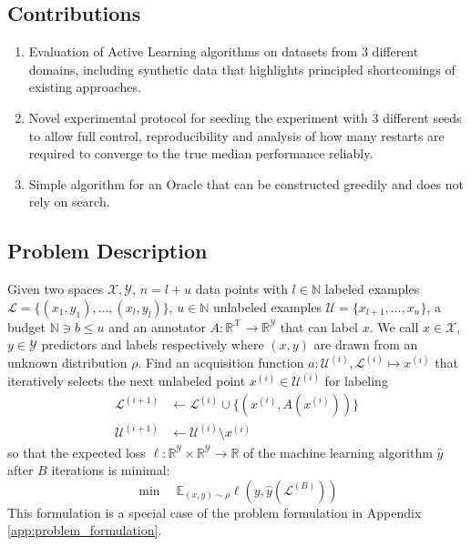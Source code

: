 \documentclass[]{article}
\newcommand{\U}{\mathcal{U}}
\newcommand{\LL}{\mathcal{L}}
\begin{document}
\subsection*{Contributions}
\begin{enumerate}
	\item Evaluation of Active Learning algorithms on datasets from 3 different domains, including synthetic data that highlights principled shortcomings of existing approaches.
	\item Novel experimental protocol for seeding the experiment with 3 different seeds to allow full control, reproducibility and analysis of how many restarts are required to converge to the true median performance reliably.
	\item Simple algorithm for an Oracle that can be constructed greedily and does not rely on search.
\end{enumerate}


\subsection{Problem Description}
Given two spaces $\mathcal{X}, \mathcal{Y}$, $n=l+u$ data points with $l \in \mathbb{N}$ labeled examples $\mathcal{L} = \{(x_1, y_1),\ldots, (x_l,y_l)\}$, $u \in \mathbb{N}$ unlabeled examples $\mathcal{U} = \{x_{l+1},\ldots,x_{n}\}$, a budget $\mathbb{N} \ni b \le u$ and an annotator $A: \mathbb{R}^\mathcal{X} \to \mathbb{R}^\mathcal{Y}$ that can label $x$. 
We call $x \in \mathcal{X}$, $y \in \mathcal{Y}$ predictors and labels respectively where $(x,y)$ are drawn from an unknown distribution $\rho$. 
Find an acquisition function $a: \U^{(i)},\LL^{(i)} \mapsto x^{(i)}$ that iteratively selects the next unlabeled point $x^{(i)} \in \U^{(i)}$ for labeling
\begin{align*}
	\LL^{(i+1)} &\gets \LL^{(i)} \cup \{\left(x^{(i)}, A(x^{(i)})\right)\} \\
	\U^{(i+1)} &\gets \U^{(i)} \setminus x^{(i)} %
\end{align*}
so that the expected loss $\ell: \mathbb{R}^\mathcal{Y} \times \mathbb{R}^\mathcal{Y} \to \mathbb{R}$ of the machine learning algorithm $\hat y$ after $B$ iterations is minimal: 
$$\min \quad \mathbb{E}_{(x,y) \sim \rho} \ell(y, \hat{y}(\LL^{(B)}))$$
This formulation is a special case of the problem formulation in Appendix \ref{app:problem_formulation}.

\newpage
\end{document}
